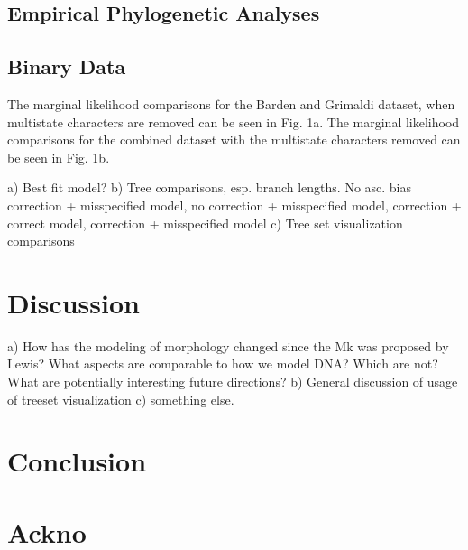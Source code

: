 \documentclass[]{article}
\begin{document}
\subsection{Empirical Phylogenetic Analyses}
\subsection{Binary Data}

The marginal likelihood comparisons for the Barden and Grimaldi dataset, when multistate characters are removed can be seen in Fig. 1a.
The marginal likelihood comparisons for the combined dataset with the multistate characters removed can be seen in Fig. 1b.




	a) Best fit model?
	b) Tree comparisons, esp. branch lengths. No asc. bias correction + misspecified model, no correction + misspecified model, correction + correct model, correction + misspecified model 
	c) Tree set visualization comparisons
	
\section{Discussion}	

	a) How has the modeling of morphology changed since the Mk was proposed by Lewis? What aspects are comparable to how we model DNA? Which are not? What are potentially interesting future directions? 
	b) General discussion of usage of treeset visualization
	c) something else.

\section{Conclusion}	


\section{Ackno}	



\end{document}
